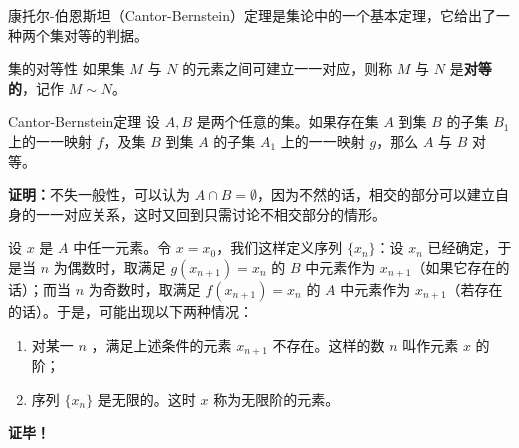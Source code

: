 康托尔-伯恩斯坦（Cantor-Bernstein）定理是集论中的一个基本定理，它给出了一种两个集对等的判据。
\begin{definition}{集的对等性}
如果集 $M$ 与 $N$ 的元素之间可建立一一对应，则称 $M$ 与 $N$ 是\textbf{对等的}，记作 $M\sim N$。
\end{definition}
\begin{theorem}{Cantor-Bernstein定理}
设 $A,B$ 是两个任意的集。如果存在集 $A$ 到集 $B$ 的子集 $B_1$ 上的一一映射 $f$，及集 $B$ 到集 $A$ 的子集 $A_1$ 上的一一映射 $g$，那么 $A$ 与 $B$ 对等。
\end{theorem}
\textbf{证明：}不失一般性，可以认为 $A\cap B=\emptyset$，因为不然的话，相交的部分可以建立自身的一一对应关系，这时又回到只需讨论不相交部分的情形。

设 $x$ 是 $A$ 中任一元素。令 $x=x_0$，我们这样定义序列 $\{x_n\}$：设 $x_n$ 已经确定，于是当 $n$ 为偶数时，取满足 $g(x_{n+1})=x_n$ 的 $B$ 中元素作为 $x_{n+1}$（如果它存在的话）；而当 $n$ 为奇数时，取满足 $f(x_{n+1})=x_n$ 的 $A$ 中元素作为 $x_{n+1}$（若存在的话）。于是，可能出现以下两种情况：
\begin{enumerate}
\item 对某一 $n$ ，满足上述条件的元素 $x_{n+1}$ 不存在。这样的数 $n$ 叫作元素 $x$ 的阶；
\item 序列 $\{x_n\}$ 是无限的。这时 $x$ 称为无限阶的元素。
\end{enumerate}



\textbf{证毕！}